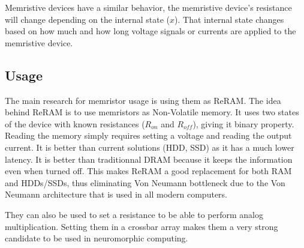 Memristive devices have a similar behavior, the memristive device's resistance will change depending on the internal state ($x$). That internal state changes based on how much and how long voltage signals or currents are applied to the memristive device.

\subsection{Usage}
The main research for memristor usage is using them as ReRAM. The idea behind ReRAM is to use memristors as Non-Volatile memory. It uses two states of the device with known resistances ($R_{on}$ and $R_{off}$), giving it binary property. Reading the memory simply requires setting a voltage and reading the output current. It is better than current solutions (HDD, SSD) as it has a much lower latency. It is better than traditionnal DRAM because it keeps the information even when turned off. This makes ReRAM a good replacement for both RAM and HDDs/SSDs, thus eliminating Von Neumann bottleneck due to the Von Neumann architecture that is used in all modern computers.

They can also be used to set a resistance to be able to perform analog multiplication. Setting them in a crossbar array makes them a very strong candidate to be used in neuromorphic computing.

